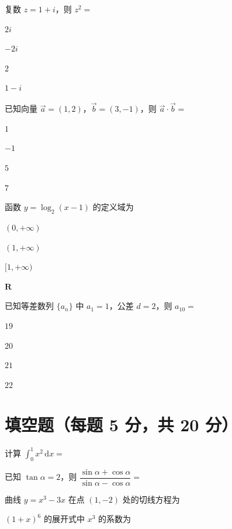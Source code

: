 \documentclass{exam-zh}
\begin{document}
\begin{question}
复数 $z=1+i$，则 $z^2=$ \paren
\begin{choices}
\item $2i$
\item $-2i$
\item $2$
\item $1-i$
\end{choices}
\end{question}
\begin{question}
已知向量 $\vec a=(1,2)$，$\vec b=(3,-1)$，则 $\vec a\cdot\vec b=$ \paren
\begin{choices}
\item $1$
\item $-1$
\item $5$
\item $7$
\end{choices}
\end{question}
\begin{question}
函数 $y=\log_2(x-1)$ 的定义域为 \paren
\begin{choices}
\item $(0,+\infty)$
\item $(1,+\infty)$
\item $[1,+\infty)$
\item $\mathbf{R}$
\end{choices}
\end{question}
\begin{question}
已知等差数列 $\{a_n\}$ 中 $a_1=1$，公差 $d=2$，则 $a_{10}=$ \paren
\begin{choices}
\item $19$
\item $20$
\item $21$
\item $22$
\end{choices}
\end{question}

\section{填空题（每题 5 分，共 20 分）}
\begin{question}
计算 $\displaystyle\int_0^1 x^2\,\mathrm{d}x=$ 
\end{question}
\begin{question}
已知 $\tan\alpha=2$，则 $\dfrac{\sin\alpha+\cos\alpha}{\sin\alpha-\cos\alpha}=$ 
\end{question}
\begin{question}
曲线 $y=x^3-3x$ 在点 $(1,-2)$ 处的切线方程为 
\end{question}
\begin{question}
$(1+x)^6$ 的展开式中 $x^3$ 的系数为 
\end{question}
\end{document}
